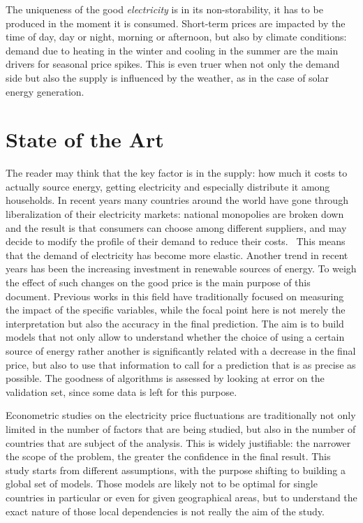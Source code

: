 \documentclass[a4paper,12pt]{book}
\begin{document}
The uniqueness of the good \textit{electricity} is in its non-storability, it has to be produced in the moment it is consumed. Short-term prices are impacted by the time of day, day or night, morning or afternoon, but also by climate conditions: demand due to heating in the winter and cooling in the summer are the main drivers for seasonal price spikes. This is even truer when not only the demand side but also the supply is influenced by the weather, as in the case of solar energy generation.

\section{State of the Art}

The reader may think that the key factor is in the supply: how much it costs to actually source energy, getting electricity and especially distribute it among households. In recent years many countries around the world have gone through liberalization of their electricity markets: national monopolies are broken down and the result is that consumers can choose among different suppliers, and may decide to modify the profile of their demand to reduce their costs.~\cite{867149} This means that the demand of electricity has become more elastic. Another trend in recent years has been the increasing investment in renewable sources of energy. To weigh the effect of such changes on the good price is the main purpose of this document. Previous works in this field have traditionally focused on measuring the impact of the specific variables, while the focal point here is not merely the interpretation but also the accuracy in the final prediction. The aim is to build models that not only allow to understand whether the choice of using a certain source of energy rather another is significantly related with a decrease in the final price, but also to use that information to call for a prediction that is as precise as possible. The goodness of algorithms is assessed by looking at error on the validation set, since some data is left for this purpose.

Econometric studies on the electricity price fluctuations are traditionally not only limited in the number of factors that are being studied, but also in the number of countries that are subject of the analysis. This is widely justifiable: the narrower the scope of the problem, the greater the confidence in the final result. This study starts from different assumptions, with the purpose shifting to building a global set of models. Those models are likely not to be optimal for single countries in particular or even for given geographical areas, but to understand the exact nature of those local dependencies is not really the aim of the study.
\end{document}
